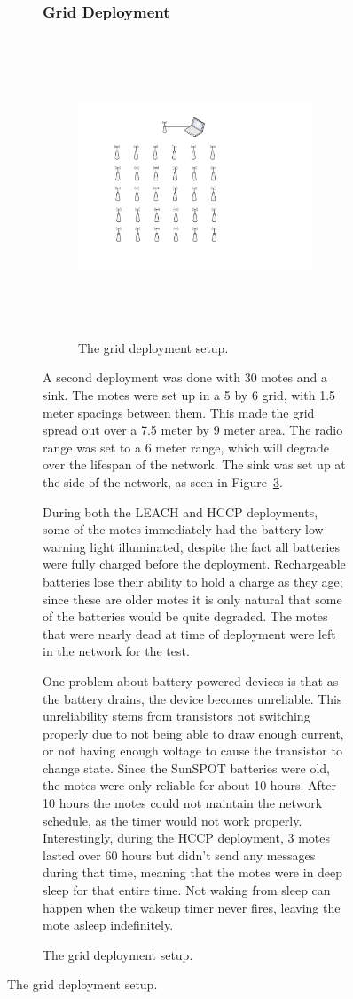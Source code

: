 \begin{figure}
\begin{figure}
\subsubsection{Grid Deployment}

\begin{figure}[htb]
    \centering
        \includegraphics[height=3.5in]{images/deployment/gridChopped.pdf}
    \caption{The grid deployment setup.}
    \label{fig:images_deployment_gridChopped}
\end{figure}


A second deployment was done with 30 motes and a sink. The motes were set up in a 5 by 6 grid,
with 1.5 meter spacings between them. This made the grid spread out over a 7.5 meter by 9 meter 
area. The radio range was set to a 6 meter range, which will degrade over the lifespan of the network.
The sink was set up at the side of the network, as seen in Figure~\ref{fig:images_deployment_gridChopped}.

During both the LEACH and HCCP deployments, some of the motes immediately had the battery low warning light illuminated, 
despite the fact all batteries were fully charged before the deployment. Rechargeable batteries lose their ability to 
hold a charge as they age; since these are older motes it is only natural that some of the batteries would
be quite degraded. The motes that were nearly dead at time of deployment were left in the network for the test.

One problem about battery-powered devices is that as the battery drains, the device 
becomes unreliable. This unreliability stems from transistors not switching properly due
to not being able to draw enough current, or not having enough voltage to cause the
transistor to change state. Since the SunSPOT batteries were old, the motes were only reliable 
for about 10 hours. After 10 hours the motes could not maintain the network schedule, as 
the timer would not work properly. Interestingly, during the HCCP deployment, 
3 motes lasted over 60 hours but didn't send any messages during that time, meaning that the
motes were in deep sleep for that entire time. Not waking from sleep can happen when 
the wakeup timer never fires, leaving the mote asleep indefinitely.



\end{figure}
\end{figure}
